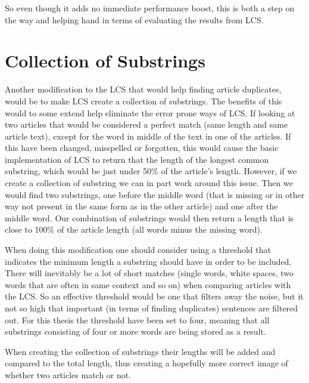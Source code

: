 So even though it adds no immediate performance boost, this is both a step on the way and helping hand in terms of evaluating the results from LCS.

\section{Collection of Substrings}
Another modification to the LCS that would help finding article duplicates, would be to make LCS create a collection of substrings. The benefits of this would to some extend help eliminate the error prone ways of LCS. If looking at two articles that would be considered a perfect match (same length and same article text), except for the word in middle of the text in one of the articles. If this have been changed, misspelled or forgotten, this would cause the basic implementation of LCS to return that the length of the longest common substring, which would be just under 50\% of the article's length. However, if we create a collection of substring we can in part work around this issue. Then we would find two substrings, one before the middle word (that is missing or in other way not present in the same form as in the other article) and one after the middle word. Our combination of substrings would then return a length that is close to 100\% of the article length (all words minus the missing word).

When doing this modification one should consider using a threshold that indicates the minimum length a substring should have in order to be included. There will inevitably be a lot of short matches (single words, white spaces, two words that are often in same context and so on) when comparing articles with the LCS. So an effective threshold would be one that filters away the noise, but it not so high that important (in terms of finding duplicates) sentences are filtered out. For this thesis the threshold have been set to four, meaning that all substrings consisting of four or more words are being stored as a result.

When creating the collection of substrings their lengths will be added and compared to the total length, thus creating a hopefully more correct image of whether two articles match or not.

